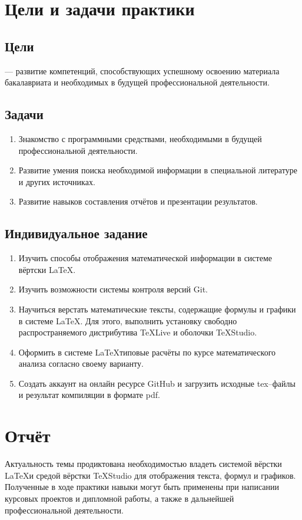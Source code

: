 \documentclass[12pt]{article}
\begin{document}
\section{Цели и задачи практики}	
\subsection{Цели}
--- развитие компетенций, способствующих успешному освоению материала бакалавриата и необходимых в будущей профессиональной деятельности.

\subsection{Задачи}
\begin{enumerate}
\item Знакомство с программными средствами, необходимыми в будущей профессиональной деятельности.
\item Развитие умения поиска необходимой информации в специальной литературе и других источниках.
\item Развитие навыков составления отчётов и презентации результатов.
\end{enumerate}

\subsection{Индивидуальное задание}	
\begin{enumerate}
\item Изучить способы отображения математической информации в системе вёртски \LaTeX.
\item Изучить возможности  системы контроля версий \textsf{Git}.
\item Научиться верстать математические тексты, содержащие формулы и графики в системе \LaTeX.
Для этого, выполнить установку свободно распространяемого дистрибутива \textsf{TeXLive} и оболочки \textsf{TeXStudio}.
\item Оформить в системе \LaTeX типовые расчёты по курсе математического анализа согласно своему варианту.
\item Создать аккаунт на онлайн ресурсе \textsf{GitHub} и загрузить исходные \textsf{tex}--файлы 
и результат компиляции в формате \textsf{pdf}.
\end{enumerate} 

\newpage
\section{Отчёт}
Актуальность темы продиктована необходимостью владеть системой вёрстки \LaTeX и средой вёрстки \textsf{TeXStudio} для
отображения текста, формул и графиков. Полученные в ходе практики навыки могут быть применены при написании
курсовых проектов и дипломной работы, а также в дальнейшей профессиональной деятельности.
\end{document}
